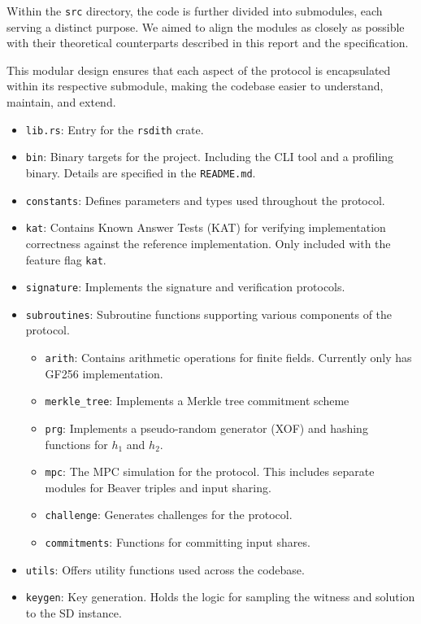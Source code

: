 \documentclass[11pt]{report}
\theoremstyle{definition}
\theoremstyle{plain}
\begin{document}
Within the \texttt{src} directory, the code is further divided into submodules, each serving a distinct purpose. We aimed to align the modules as closely as possible with their theoretical counterparts described in this report and the specification.

This modular design ensures that each aspect of the protocol is encapsulated within its respective submodule, making the codebase easier to understand, maintain, and extend.

\begin{itemize}[itemsep=2pt, parsep=0pt]
  \item \texttt{lib.rs}: Entry for the \texttt{rsdith} crate.
  \item \texttt{bin}: Binary targets for the project. Including the CLI tool and a profiling binary. Details are specified in the \texttt{README.md}.
  \item \texttt{constants}: Defines parameters and types used throughout the protocol.
  \item \texttt{kat}: Contains Known Answer Tests (KAT) for verifying implementation correctness against the reference implementation. Only included with the feature flag \texttt{kat}.
  \item \texttt{signature}: Implements the signature and verification protocols.
  \item \texttt{subroutines}: Subroutine functions supporting various components of the protocol.
        \begin{itemize}[itemsep=2pt, parsep=0pt]
          \item \texttt{arith}: Contains arithmetic operations for finite fields. Currently only has GF256 implementation.
          \item \texttt{merkle\_tree}: Implements a Merkle tree commitment scheme
          \item \texttt{prg}: Implements a pseudo-random generator (XOF) and hashing functions for $h_1$ and $h_2$.
          \item \texttt{mpc}: The MPC simulation for the protocol. This includes separate modules for Beaver triples and input sharing.
          \item \texttt{challenge}: Generates challenges for the protocol.
          \item \texttt{commitments}: Functions for committing input shares.
        \end{itemize}
  \item \texttt{utils}: Offers utility functions used across the codebase.
  \item \texttt{keygen}: Key generation. Holds the logic for sampling the witness and solution to the SD instance.
\end{itemize}
\end{document}
